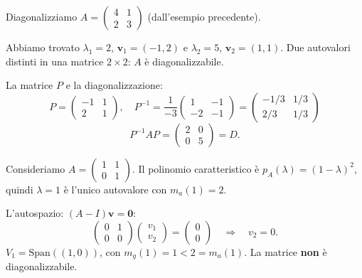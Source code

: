 \begin{examplebox}
Diagonalizziamo $A = \begin{pmatrix} 4 & 1 \\ 2 & 3 \end{pmatrix}$ (dall'esempio precedente).

Abbiamo trovato $\lambda_1 = 2$, $\mathbf{v}_1 = (-1, 2)$ e $\lambda_2 = 5$, $\mathbf{v}_2 = (1, 1)$.
Due autovalori distinti in una matrice $2 \times 2$: $A$ è diagonalizzabile.

La matrice $P$ e la diagonalizzazione:
\[ P = \begin{pmatrix} -1 & 1 \\ 2 & 1 \end{pmatrix}, \quad P^{-1} = \frac{1}{-3}\begin{pmatrix} 1 & -1 \\ -2 & -1 \end{pmatrix} = \begin{pmatrix} -1/3 & 1/3 \\ 2/3 & 1/3 \end{pmatrix} \]
\[ P^{-1}AP = \begin{pmatrix} 2 & 0 \\ 0 & 5 \end{pmatrix} = D. \]
\end{examplebox}

\begin{examplebox}
Consideriamo $A = \begin{pmatrix} 1 & 1 \\ 0 & 1 \end{pmatrix}$. Il polinomio caratteristico è $p_A(\lambda) = (1 - \lambda)^2$, quindi $\lambda = 1$ è l'unico autovalore con $m_a(1) = 2$.

L'autospazio: $(A - I)\mathbf{v} = \mathbf{0}$:
\[ \begin{pmatrix} 0 & 1 \\ 0 & 0 \end{pmatrix} \begin{pmatrix} v_1 \\ v_2 \end{pmatrix} = \begin{pmatrix} 0 \\ 0 \end{pmatrix} \quad \Longrightarrow \quad v_2 = 0. \]
$V_1 = \text{Span}((1,0))$, con $m_g(1) = 1 < 2 = m_a(1)$. La matrice \textbf{non} è diagonalizzabile.
\end{examplebox}

